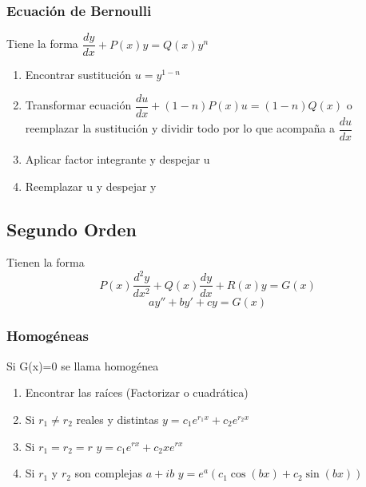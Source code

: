 \subsubsection{Ecuación de Bernoulli}
Tiene la forma $\dfrac{dy}{dx}+P(x)y=Q(x)y^n$

\begin{enumerate}
	\item Encontrar sustitución $u=y^{1-n}$
	\item Transformar ecuación $\dfrac{du}{dx}+(1-n)P(x)u=(1-n)Q(x)$ o reemplazar la sustitución y dividir todo por lo que acompaña a $\dfrac{du}{dx}$
	\item Aplicar factor integrante y despejar u
	\item Reemplazar u y despejar y
\end{enumerate}

\subsection{Segundo Orden}
Tienen la forma $$P(x)\dfrac{d^2y}{dx^2}+Q(x)\dfrac{dy}{dx}+R(x)y=G(x)$$
$$ay''+by'+cy=G(x)$$

\subsubsection{Homogéneas}
Si G(x)=0 se llama homogénea

	\begin{enumerate}
		\item Encontrar las raíces (Factorizar o cuadrática)
		\item Si $r_1\not= r_2$ reales y distintas $y=c_1e^{r_1x}+c_2e^{r_2x}$
		\item Si $r_1=r_2=r$ $y=c_1e^{rx}+c_2xe^{rx}$
		\item Si $r_1$ y $r_2$ son complejas $a+ib$  $y=e^a(c_1\cos(bx)+c_2\sin(bx))$
	\end{enumerate}
